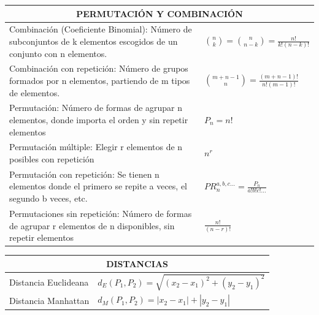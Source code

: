 \documentclass[10pt,landscape,twocolumn,letterpaper,twosided]{article}
\begin{document}
\begin{center}
\tabletail{
	\midrule 
}
\tablelasttail{}
{\renewcommand{\arraystretch}{1.4}


\begin{tabular}{|p{6.5cm}|p{3.9cm}|}
	\hline
	\multicolumn{2}{|c|}{PERMUTACIÓN Y COMBINACIÓN} \\ \hline
	Combinación (Coeficiente Binomial): Número de subconjuntos de k elementos escogidos de un conjunto con n elementos.
		& $ \binom{n}{k} = \binom{n}{n-k} = \displaystyle\frac{n!}{k!(n-k)!} $ \\ \hline

	Combinación con repetición: Número de grupos formados por n elementos, partiendo de m tipos de elementos.
		& $ \binom{m+n-1}{n} = \displaystyle\frac{(m + n - 1)!}{n!(m-1)!} $ \\ \hline
		
	Permutación: Número de formas de agrupar n elementos, donde importa el orden y sin repetir elementos
		& $ P_{n} = n! $ \\ \hline

	Permutación múltiple: Elegir r elementos de n posibles con repetición 
		& $ n^{r} $	\\ \hline
	
	Permutación con repetición: Se tienen n elementos donde el primero se repite a veces, el segundo b veces, etc.
		& $ PR_{n}^{a,b,c...} = \displaystyle\frac{P_{n}}{a!b!c!...}$ \\ \hline
	
	Permutaciones sin repetición: Número de formas de agrupar r elementos de n disponibles, sin repetir elementos
		& $\displaystyle\frac{n!}{(n-r)!}$ \\ \hline
\end{tabular}


\begin{tabular}{|p{2.2cm}|p{8.2cm}|}
	\hline
	\multicolumn{2}{|c|}{DISTANCIAS} \\ \hline
	Distancia Euclideana & $d_{E}(P_{1},P_{2}) = \sqrt{(x_{2}-x_{1})^{2}+(y_{2}-y_{1})^{2}}$ \\ \hline
	Distancia Manhattan & $d_{M}(P_{1}, P_{2}) = |x_{2} - x_{1}| + |y_{2} - y_{1}|$ \\ \hline 
\end{tabular}

}
\end{center}
\end{document}
